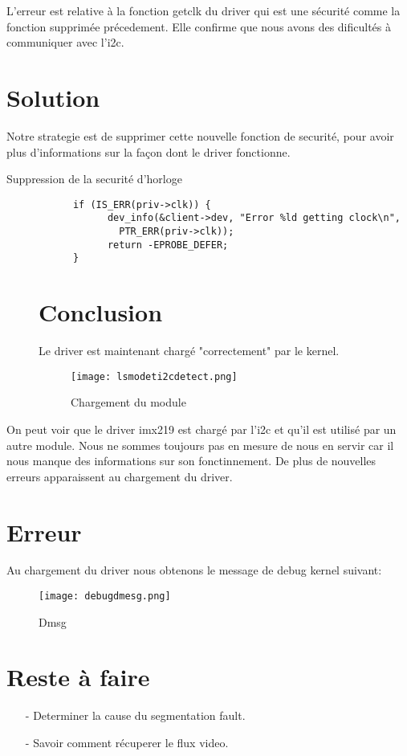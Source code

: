 L'erreur est relative à la fonction getclk du driver qui est une sécurité comme la fonction supprimée précedement.
Elle confirme que nous avons des dificultés à communiquer avec l'i2c.

\section{Solution}
Notre strategie est de supprimer cette nouvelle fonction de securité, pour avoir plus
d'informations sur la façon dont le driver fonctionne.
\begin{description}
  \item[Suppression de la securité d'horloge]
    \begin{lstlisting}
	  if (IS_ERR(priv->clk)) {
		    dev_info(&client->dev, "Error %ld getting clock\n",
			  PTR_ERR(priv->clk));
		    return -EPROBE_DEFER;
	  }
    \end{lstlisting}
\section{Conclusion}
Le driver est maintenant chargé "correctement" par le kernel.

\begin{figure}[th]
  \centering
  \texttt{[image: lsmodeti2cdetect.png]}
  \decoRule
  \caption{Chargement du module}  \label{fig:chargement}
\end{figure}
\end{description}

  On peut voir que le driver imx219 est chargé par l'i2c et
  qu'il est utilisé par un autre module. Nous ne sommes toujours pas en mesure
  de nous en servir car il nous manque des informations sur son fonctinnement.
  De plus de nouvelles erreurs apparaissent au chargement du driver.

\clearpage

  \section{Erreur}
  Au chargement du driver nous obtenons le message de debug kernel suivant:

  \begin{figure}[th]
    \centering
    \texttt{[image: debugdmesg.png]}
    \decoRule
    \caption{Dmsg}  \label{fig:dmsg}
  \end{figure}

  \section{Reste à faire}

  \begin{itemize}
  \item[-] Determiner la cause du segmentation fault.
  \item[-] Savoir comment récuperer le flux video.
  \end{itemize}
